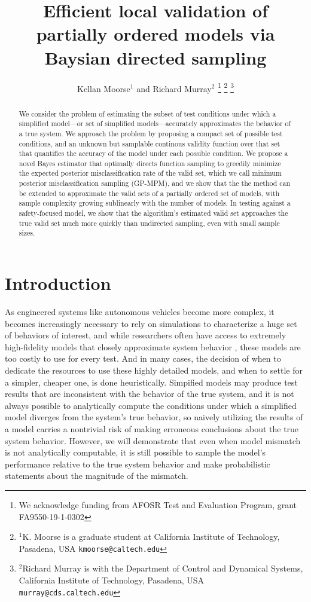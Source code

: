 \documentclass[letterpaper, 10 pt, conference]{ieeeconf}  %
\title{\LARGE \bf
Efficient local validation of partially ordered models via Baysian directed sampling
}
\author{Kellan Moorse$^{1}$ and Richard Murray$^{2}$%
\thanks{We acknowledge funding from AFOSR Test and Evaluation Program, grant FA9550-19-1-0302}%
\thanks{$^{1}$K. Moorse is a graduate student at California Institute of Technology,
Pasadena, USA
        {\tt\small kmoorse@caltech.edu}}%
\thanks{$^{2}$Richard Murray is with the Department of Control and Dynamical Systems, California Institute of Technology,
Pasadena, USA
        {\tt\small murray@cds.caltech.edu}}%
}
\begin{document}
\maketitle
\thispagestyle{empty}
\pagestyle{empty}


\begin{abstract}

We consider the problem of estimating the subset of test conditions under which a simplified model---or set of simplified models---accurately approximates the behavior of a true system. We approach the problem by proposing a compact set of possible test conditions, and an unknown but samplable continous validity function over that set that quantifies the accuracy of the model under each possible condition. We propose a novel Bayes estimator that optimally directs function sampling to greedily minimize the expected posterior misclassification rate of the valid set, which we call minimum posterior misclassification sampling (GP-MPM), and we show that the the method can be extended to approximate the valid sets of a partially ordered set of models, with sample complexity growing sublinearly with the number of models. In testing against a safety-focused model, we show that the algorithm's estimated valid set approaches the true valid set much more quickly than undirected sampling, even with small sample sizes.
\end{abstract}


\section{Introduction}

As engineered systems like autonomous vehicles become more complex, it becomes increasingly necessary to rely on simulations to characterize a huge set of behaviors of interest, and while researchers often have access to extremely high-fidelity models that closely approximate system behavior \cite{mcruer75, pearce62}, these models are too costly to use for every test. And in many cases, the decision of when to dedicate the resources to use these highly detailed models, and when to settle for a simpler, cheaper one, is done heuristically. Simpified models may produce test results that are inconsistent with the behavior of the true system, and it is not always possible to analytically compute the conditions under which a simplified model diverges from the system's true behavior, so naively utilizing the results of a model carries a nontrivial risk of making erroneous conclusions about the true system behavior. However, we will demonstrate that even when model mismatch is not analytically computable, it is still possible to sample the model's performance relative to the true system behavior and make probabilistic statements about the magnitude of the mismatch.
\newline
\end{document}
